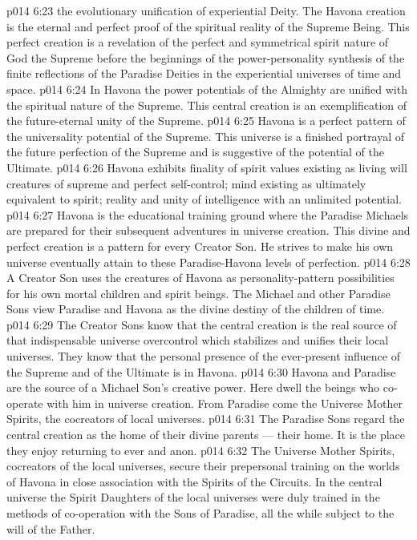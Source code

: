 \vs p014 6:23 \pc {}\bibnobreakspace {} the evolutionary unification of experiential Deity. The Havona creation is the eternal and perfect proof of the spiritual reality of the Supreme Being. This perfect creation is a revelation of the perfect and symmetrical spirit nature of God the Supreme before the beginnings of the power\hyp{}personality synthesis of the finite reflections of the Paradise Deities in the experiential universes of time and space.
\vs p014 6:24 In Havona the power potentials of the Almighty are unified with the spiritual nature of the Supreme. This central creation is an exemplification of the future\hyp{}eternal unity of the Supreme.
\vs p014 6:25 Havona is a perfect pattern of the universality potential of the Supreme. This universe is a finished portrayal of the future perfection of the Supreme and is suggestive of the potential of the Ultimate.
\vs p014 6:26 Havona exhibits finality of spirit values existing as living will creatures of supreme and perfect self\hyp{}control; mind existing as ultimately equivalent to spirit; reality and unity of intelligence with an unlimited potential.
\vs p014 6:27 \pc {}\bibnobreakspace {} Havona is the educational training ground where the Paradise Michaels are prepared for their subsequent adventures in universe creation. This divine and perfect creation is a pattern for every Creator Son. He strives to make his own universe eventually attain to these Paradise\hyp{}Havona levels of perfection.
\vs p014 6:28 A Creator Son uses the creatures of Havona as personality\hyp{}pattern possibilities for his own mortal children and spirit beings. The Michael and other Paradise Sons view Paradise and Havona as the divine destiny of the children of time.
\vs p014 6:29 The Creator Sons know that the central creation is the real source of that indispensable universe overcontrol which stabilizes and unifies their local universes. They know that the personal presence of the ever\hyp{}present influence of the Supreme and of the Ultimate is in Havona.
\vs p014 6:30 Havona and Paradise are the source of a Michael Son’s creative power. Here dwell the beings who co\hyp{}operate with him in universe creation. From Paradise come the Universe Mother Spirits, the cocreators of local universes.
\vs p014 6:31 The Paradise Sons regard the central creation as the home of their divine parents --- their home. It is the place they enjoy returning to ever and anon.
\vs p014 6:32 \pc {}\bibnobreakspace {} The Universe Mother Spirits, cocreators of the local universes, secure their prepersonal training on the worlds of Havona in close association with the Spirits of the Circuits. In the central universe the Spirit Daughters of the local universes were duly trained in the methods of co\hyp{}operation with the Sons of Paradise, all the while subject to the will of the Father.
